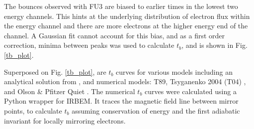 \documentclass[draft,linenumbers]{agujournal}
\begin{document}
The bounces observed with FU3 are biased to earlier times in the lowest two energy channels. This hints at the underlying distribution of electron flux within the energy channel and there are more electrons at the higher energy end of the channel. A Gaussian fit cannot account for this bias, and as a first order correction, minima between peaks was used to calculate $t_b$, and is shown in Fig. \ref{tb_plot}.

Superposed on Fig. \ref{tb_plot}, are $t_b$ curves for various models including an analytical solution from \citet{Schulz74}, and numerical models: T89, Tsyganenko 2004 (T04) \citep{Tsyganenko05}, and Olson \& Pfitzer Quiet \citep{Olson82}. The numerical $t_b$ curves were calculated using a Python wrapper for IRBEM. It traces the magnetic field line between mirror points, to calculate $t_b$ assuming conservation of energy and the first adiabatic invariant for locally mirroring electrons. 

%
\end{document}
